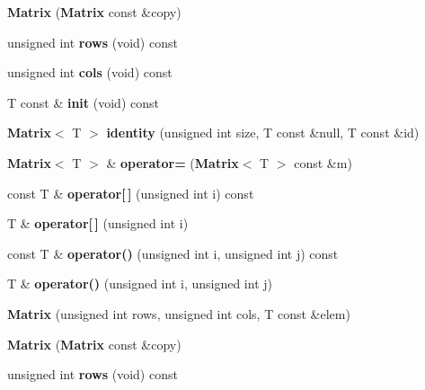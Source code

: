 \begin{DoxyCompactItemize}
\item 
{\bfseries Matrix} ({\bf Matrix} const \&copy)\label{class_g_a_n_n_1_1_matrix_a9af1de05104cf864d0089575e772b74b}

\item 
unsigned int {\bfseries rows} (void) const \label{class_g_a_n_n_1_1_matrix_a14c1233ee25f1cd5823676277e1956f2}

\item 
unsigned int {\bfseries cols} (void) const \label{class_g_a_n_n_1_1_matrix_adc449f757249fe5bfc5bdae3c809d7e7}

\item 
T const \& {\bfseries init} (void) const \label{class_g_a_n_n_1_1_matrix_a5369d9c2dc7ae6a0941f1aba36f15259}

\item 
{\bf Matrix}$<$ T $>$ {\bfseries identity} (unsigned int size, T const \&null, T const \&id)\label{class_g_a_n_n_1_1_matrix_ae61ef07a101463ad49ab8f9f7dd4f2fe}

\item 
{\bf Matrix}$<$ T $>$ \& {\bfseries operator=} ({\bf Matrix}$<$ T $>$ const \&m)\label{class_g_a_n_n_1_1_matrix_a0aa93d1a66567637deb98c943f936fd4}

\item 
const T \& {\bfseries operator[$\,$]} (unsigned int i) const \label{class_g_a_n_n_1_1_matrix_add9f200cb6a2e53709090621e3a1150a}

\item 
T \& {\bfseries operator[$\,$]} (unsigned int i)\label{class_g_a_n_n_1_1_matrix_a700ad2c1e9ab4fd76fe1cb18092a80f1}

\item 
const T \& {\bfseries operator()} (unsigned int i, unsigned int j) const \label{class_g_a_n_n_1_1_matrix_aa3bef5292a718f45e094926602ff65ca}

\item 
T \& {\bfseries operator()} (unsigned int i, unsigned int j)\label{class_g_a_n_n_1_1_matrix_ac3f7f2d7467ba5bc95fca1890be74a38}

\item 
{\bfseries Matrix} (unsigned int rows, unsigned int cols, T const \&elem)\label{class_g_a_n_n_1_1_matrix_a370ad3ace72e48cf5ac3d2fd672dd679}

\item 
{\bfseries Matrix} ({\bf Matrix} const \&copy)\label{class_g_a_n_n_1_1_matrix_a9af1de05104cf864d0089575e772b74b}

\item 
unsigned int {\bfseries rows} (void) const \label{class_g_a_n_n_1_1_matrix_a14c1233ee25f1cd5823676277e1956f2}


\end{DoxyCompactItemize}
